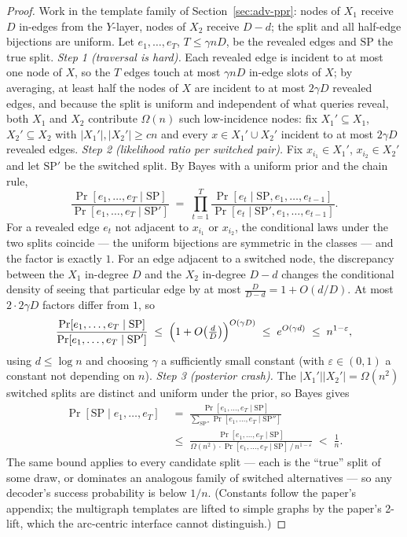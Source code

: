 \begin{proof}
Work in the template family of Section~\ref{sec:adv-ppr}: nodes of $X_1$ receive $D$ in-edges
from the $Y$-layer, nodes of $X_2$ receive $D-d$; the split and all half-edge bijections are
uniform. Let $e_1,\dots,e_T$, $T \le \gamma n D$, be the revealed edges and
$\mathrm{SP}$ the true split. \emph{Step 1 (traversal is hard).} Each revealed edge is
incident to at most one node of $X$, so the $T$ edges touch at most $\gamma n D$ in-edge
slots of $X$; by averaging, at least half the nodes of $X$ are incident to at most $2\gamma D$
revealed edges, and because the split is uniform and independent of what queries reveal, both
$X_1$ and $X_2$ contribute $\Omega(n)$ such low-incidence nodes: fix $X_1' \subseteq X_1$,
$X_2' \subseteq X_2$ with $|X_1'|, |X_2'| \ge c n$ and every $x \in X_1' \cup X_2'$ incident
to at most $2\gamma D$ revealed edges. \emph{Step 2 (likelihood ratio per switched pair).}
Fix $x_{i_1} \in X_1'$, $x_{i_2} \in X_2'$ and let $\mathrm{SP}'$ be the switched split. By
Bayes with a uniform prior and the chain rule,
\[
\frac{\Pr[e_1,\dots,e_T \mid \mathrm{SP}]}{\Pr[e_1,\dots,e_T \mid \mathrm{SP}']}
\;=\; \prod_{t=1}^{T}
\frac{\Pr[e_t \mid \mathrm{SP}, e_1,\dots,e_{t-1}]}
     {\Pr[e_t \mid \mathrm{SP}', e_1,\dots,e_{t-1}]}.
\]
For a revealed edge $e_t$ not adjacent to $x_{i_1}$ or $x_{i_2}$, the conditional laws under
the two splits coincide --- the uniform bijections are symmetric in the classes --- and the
factor is exactly $1$. For an edge adjacent to a switched node, the discrepancy between the
$X_1$ in-degree $D$ and the $X_2$ in-degree $D-d$ changes the conditional density of seeing
that particular edge by at most $\tfrac{D}{D-d} = 1 + O(d/D)$. At most $2 \cdot 2\gamma D$
factors differ from $1$, so
\[
\frac{\Pr[e_1,\dots,e_T \mid \mathrm{SP}]}{\Pr[e_1,\dots,e_T \mid \mathrm{SP}']}
\;\le\; \Bigl(1 + O\bigl(\tfrac{d}{D}\bigr)\Bigr)^{O(\gamma D)}
\;\le\; e^{O(\gamma d)}
\;\le\; n^{1-\varepsilon},
\]
using $d \le \log n$ and choosing $\gamma$ a sufficiently small constant (with
$\varepsilon \in (0,1)$ a constant not depending on $n$). \emph{Step 3 (posterior crash).}
The $|X_1'||X_2'| = \Omega(n^2)$ switched splits are distinct and uniform under the prior, so
Bayes gives
\begin{align*}
\Pr[\mathrm{SP} \mid e_1,\dots,e_T]
\;&=\; \frac{\Pr[e_1,\dots,e_T \mid \mathrm{SP}]}
        {\sum_{\mathrm{SP}''}\Pr[e_1,\dots,e_T \mid \mathrm{SP}'']}\\
\;&\le\; \frac{\Pr[e_1,\dots,e_T \mid \mathrm{SP}]}
        {\Omega(n^2)\cdot \Pr[e_1,\dots,e_T \mid \mathrm{SP}]\,/\,n^{1-\varepsilon}}
\;<\; \frac{1}{n}.
\end{align*}
The same bound applies to every candidate split --- each is the ``true'' split of some draw,
or dominates an analogous family of switched alternatives --- so any decoder's success
probability is below $1/n$. (Constants follow the paper's appendix; the multigraph templates
are lifted to simple graphs by the paper's 2-lift, which the arc-centric interface cannot
distinguish.)
\end{proof}



